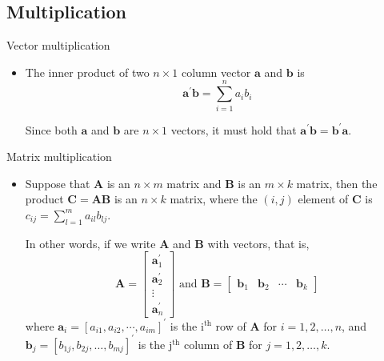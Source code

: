 \documentclass[presentation]{beamer}
\begin{document}
\subsection*{Multiplication}
\label{sec:org9fc06fc}

\begin{frame}[label={sec:org467798a}]{Vector multiplication}
\begin{itemize}
\item The \alert{inner product} of two \(n \times 1\)
column vector \(\mathbf{a}\) and \(\mathbf{b}\) is
\[ \mathbf{a}^{\prime} \mathbf{b} = \sum^n_{i=1} a_i b_i \]

Since both \(\mathbf{a}\) and \(\mathbf{b}\) are \(n \times 1\) vectors,
it must hold that \(\mathbf{a}^{\prime} \mathbf{b} =
  \mathbf{b}^{\prime} \mathbf{a}\).
\end{itemize}
\end{frame}

\begin{frame}[label={sec:org95c8334}]{Matrix multiplication}
\begin{itemize}
\item Suppose that \(\mathbf{A}\) is an \(n \times m\) matrix and
\(\mathbf{B}\) is an \(m \times k\) matrix, then the product
\(\mathbf{C} = \mathbf{AB}\) is an \(n \times k\) matrix, where the
\((i,j)\) element of \(\mathbf{C}\) is \(c_{ij} = \sum_{l=1}^m a_{il}
  b_{lj}\). 

In other words, if we write \(\mathbf{A}\) and \(\mathbf{B}\) with
vectors, that is,
\begin{equation*}
\mathbf{A} = 
\begin{bmatrix}
\mathbf{a}_1^{\prime} \\ \mathbf{a}_2^{\prime} \\ \vdots \\ \mathbf{a}_{n}^{\prime}
\end{bmatrix}
\text{ and }
\mathbf{B} = 
\begin{bmatrix}
\mathbf{b}_1 & \mathbf{b}_2 & \cdots & \mathbf{b}_k
\end{bmatrix}
\end{equation*}
where \(\mathbf{a}_i = [a_{i1}, a_{i2}, \cdots, a_{im}]^{\prime}\) is the i\(^{\text{th}}\)
row of \(\mathbf{A}\) for \(i = 1, 2, \ldots, n\), and \(\mathbf{b}_j =
  [b_{1j}, b_{2j}, \ldots, b_{mj}]^{\prime}\) is the j\(^{\text{th}}\) column of
\(\mathbf{B}\) for \(j = 1, 2, \ldots, k\).
\end{itemize}
\end{frame}
\end{document}
